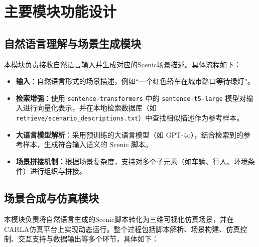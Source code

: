 \section{主要模块功能设计}
\subsection{自然语言理解与场景生成模块}
本模块负责接收自然语言输入并生成对应的Scenic场景描述。具体流程如下：
\begin{itemize}
	\item \textbf{输入}：自然语言形式的场景描述，例如“一个红色轿车在城市路口等待绿灯”。
	\item \textbf{检索增强}：使用 \texttt{sentence-transformers} 中的 \texttt{sentence-t5-large} 模型对输入进行向量化表示，并在本地检索数据库（如 \texttt{retrieve/scenario\_descriptions.txt}）中查找相似描述作为参考样本。
	\item \textbf{大语言模型解析}：采用预训练的大语言模型（如 GPT-4o），结合检索到的参考样本，生成符合输入语义的 Scenic 脚本。
	\item \textbf{场景拼接机制}：根据场景复杂度，支持对多个子元素（如车辆、行人、环境条件）进行组织与拼接。
\end{itemize}


\subsection{场景合成与仿真模块}

本模块负责将自然语言生成的Scenic脚本转化为三维可视化仿真场景，并在CARLA仿真平台上实现动态运行。整个过程包括脚本解析、场景构建、仿真控制、交互支持与数据输出等多个环节，具体如下：

